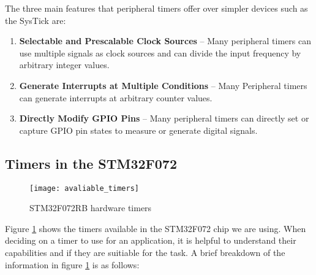 \documentclass[11pt,fleqn]{book} %
\begin{document}
        The three main features that peripheral timers offer over simpler devices such as the SysTick are:
        \begin{enumerate}
            \item \textbf{Selectable and Prescalable Clock Sources} -- Many peripheral timers can use multiple signals as clock sources and can divide the input frequency by arbitrary integer values. 
            \item \textbf{Generate Interrupts at Multiple Conditions} -- Many Peripheral timers can generate interrupts at arbitrary counter values.
            \item \textbf{Directly Modify GPIO Pins} -- Many peripheral timers can directly set or capture GPIO pin states to measure or generate digital signals.  
        \end{enumerate}
        
	
    
    \subsection{Timers in the STM32F072}
        \begin{figure}[]
            \centering\texttt{[image: avaliable\_timers]}
            \caption{STM32F072RB hardware timers}
            \label{avaliable_timers}
        \end{figure}
        
        
        Figure \ref{avaliable_timers} shows the timers available in the STM32F072 chip we are using. When deciding on a timer to use for an application, it is helpful to understand their capabilities and if they are suitiable for the task. A brief breakdown of the information in figure \ref{avaliable_timers} is as follows:
        
\end{document}
